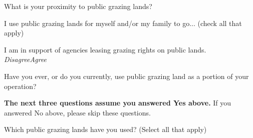 \documentclass[
  english,
  checkmode = fill,
  ]{sdapsclassic}
\begin{document}
\begin{sloppypar}
\begin{questionnaire}
    \begin{choicequestion}[cols=5]{What is your proximity to public grazing lands?}
    \end{choicequestion}
    
     \begin{markgroup}{I use public grazing lands for myself and/or my family to go... (check all that apply)}
    \end{markgroup}   
    
    
     \begin{markgroup}{ I am in support of agencies leasing grazing rights on public lands.}
      \markline{ }
 	{\emph{Disagree}}{\emph{Agree}~~}~{}~{}
      \end{markgroup}
    
    \begin{choicequestion}[cols=4]{Have you ever, or do you currently, use public grazing land as a portion of your operation?}
    \end{choicequestion}

\textbf{The next three questions assume you answered Yes above.} If you answered No above, please skip these questions.
    
    
    \begin{choicequestion}[cols=2]{Which public grazing lands have you used? (Select all that apply)}
    \end{choicequestion}
    

\end{questionnaire}
\end{sloppypar}
\end{document}
